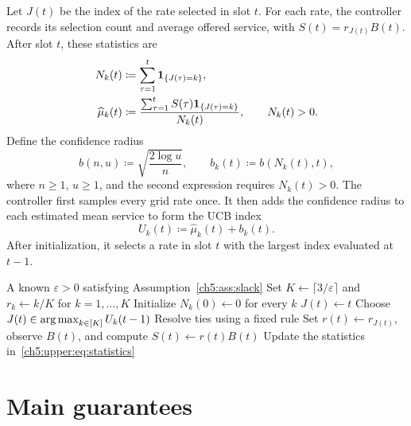 Let $J(t)$ be the index of the rate selected in slot $t$.
For each rate, the controller records its selection count and average offered
service, with $S(t)=r_{J(t)}B(t)$. After slot $t$, these statistics are
\begin{equation}
 \begin{split}
 N_k(t)&\coloneqq\sum_{\tau=1}^{t}\mathbf{1}_{\{J(\tau)=k\}},\\
 \widehat\mu_k(t)&\coloneqq
 \frac{\sum_{\tau=1}^{t}S(\tau)\mathbf{1}_{\{J(\tau)=k\}}}
 {N_k(t)},\qquad N_k(t)>0.
 \end{split}
 \label{ch5:upper:eq:statistics}
\end{equation}
Define the confidence radius
\begin{equation}
 b(n,u)\coloneqq\sqrt{\frac{2\log u}{n}},\qquad
 b_k(t)\coloneqq b(N_k(t),t),
 \label{ch5:upper:eq:confidence-radius}
\end{equation}
where $n\ge1$, $u\ge1$, and the second expression requires $N_k(t)>0$.
The controller first samples every grid rate once. It then adds the
confidence radius to each estimated mean service to form the UCB index
\begin{equation}
 U_k(t)\coloneqq\widehat\mu_k(t)+b_k(t).
 \label{ch5:upper:eq:index}
\end{equation}
After initialization, it selects a rate in slot $t$ with the largest index
evaluated at $t-1$.

\begin{algorithm}[tbp]
\caption{UCB1 rate adaptation with a known lower bound on service slack}
\label{ch5:upper:alg:ucb}
\begin{algorithmic}[1]
\Require A known $\varepsilon>0$ satisfying Assumption~\ref{ch5:ass:slack}
\State Set $K\gets\lceil 3/\varepsilon\rceil$ and $r_k\gets k/K$ for $k=1,\ldots,K$
\State Initialize $N_k(0)\gets0$ for every $k$
    \State $J(t)\gets t$
  \Else
    \State Choose $J(t)\in\operatorname*{arg\,max}_{k\in[K]}U_k(t-1)$
    \State Resolve ties using a fixed rule
  \EndIf
  \State Set $r(t)\gets r_{J(t)}$, observe $B(t)$, and compute $S(t)\gets r(t)B(t)$
  \State Update the statistics in~\eqref{ch5:upper:eq:statistics}
\EndFor
\end{algorithmic}
\end{algorithm}

\section{Main guarantees}
\label{ch5:sec:guarantees}

